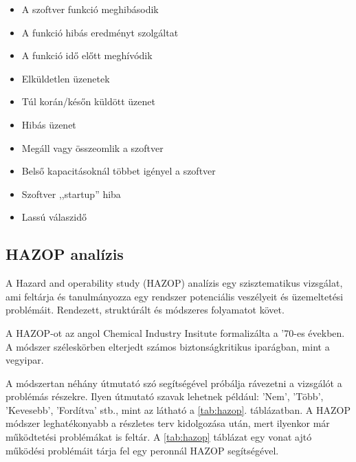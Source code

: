 \begin{itemize}
    \item A szoftver funkció meghibásodik
    \item A funkció hibás eredményt szolgáltat
    \item A funkció idő előtt meghívódik
    \item Elküldetlen üzenetek
    \item Túl korán/későn küldött üzenet
    \item Hibás üzenet
    \item Megáll vagy összeomlik a szoftver
    \item Belső kapacitásoknál többet igényel a szoftver
    \item Szoftver ,,startup'' hiba
    \item Lassú válaszidő
\end{itemize}

\subsection{HAZOP analízis}
A Hazard and operability study (HAZOP) analízis egy szisztematikus vizsgálat, ami feltárja és tanulmányozza egy rendszer potenciális veszélyeit és üzemeltetési problémáit.
Rendezett, struktúrált és módszeres folyamatot követ\cite{Ericson}.

A HAZOP-ot az angol Chemical Industry Insitute formalizálta a '70-es években.
A módszer széleskörben elterjedt számos biztonságkritikus iparágban, mint a vegyipar.

A módszertan néhány útmutató szó segítségével próbálja rávezetni a vizsgálót a problémás részekre.
Ilyen útmutató szavak lehetnek például: 'Nem', 'Több', 'Kevesebb', 'Fordítva' stb., mint az látható a \ref{tab:hazop}. táblázatban.
A HAZOP módszer leghatékonyabb a részletes terv kidolgozása után, mert ilyenkor már működtetési problémákat is feltár.
A \ref{tab:hazop} táblázat egy vonat ajtó működési problémáit tárja fel egy peronnál HAZOP segítségével.


